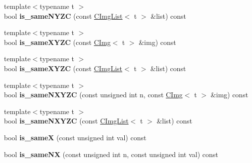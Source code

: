 \begin{DoxyCompactItemize}
\item 
\hypertarget{structcimg__library_1_1CImgList_a9d964b9defcf586d9e86625b7a97e3c5}{
{\footnotesize template$<$typename t $>$ }\\bool {\bfseries is\_\-sameNYZC} (const \hyperlink{structcimg__library_1_1CImgList}{CImgList}$<$ t $>$ \&list) const }
\label{structcimg__library_1_1CImgList_a9d964b9defcf586d9e86625b7a97e3c5}

\item 
\hypertarget{structcimg__library_1_1CImgList_a75a2889c78991b49f178a7a62013d9a1}{
{\footnotesize template$<$typename t $>$ }\\bool {\bfseries is\_\-sameXYZC} (const \hyperlink{structcimg__library_1_1CImg}{CImg}$<$ t $>$ \&img) const }
\label{structcimg__library_1_1CImgList_a75a2889c78991b49f178a7a62013d9a1}

\item 
\hypertarget{structcimg__library_1_1CImgList_a5a7ddc76848f1ea9ce123bc047d3e2fe}{
{\footnotesize template$<$typename t $>$ }\\bool {\bfseries is\_\-sameXYZC} (const \hyperlink{structcimg__library_1_1CImgList}{CImgList}$<$ t $>$ \&list) const }
\label{structcimg__library_1_1CImgList_a5a7ddc76848f1ea9ce123bc047d3e2fe}

\item 
\hypertarget{structcimg__library_1_1CImgList_a30c778297f0caf76c661b53bf29b364f}{
{\footnotesize template$<$typename t $>$ }\\bool {\bfseries is\_\-sameNXYZC} (const unsigned int n, const \hyperlink{structcimg__library_1_1CImg}{CImg}$<$ t $>$ \&img) const }
\label{structcimg__library_1_1CImgList_a30c778297f0caf76c661b53bf29b364f}

\item 
\hypertarget{structcimg__library_1_1CImgList_aa8bd5f88e9c8c1d7b946aa2466da743f}{
{\footnotesize template$<$typename t $>$ }\\bool {\bfseries is\_\-sameNXYZC} (const \hyperlink{structcimg__library_1_1CImgList}{CImgList}$<$ t $>$ \&list) const }
\label{structcimg__library_1_1CImgList_aa8bd5f88e9c8c1d7b946aa2466da743f}

\item 
\hypertarget{structcimg__library_1_1CImgList_a109ccf0092c2eb32ec57b451534c6e9a}{
bool {\bfseries is\_\-sameX} (const unsigned int val) const }
\label{structcimg__library_1_1CImgList_a109ccf0092c2eb32ec57b451534c6e9a}

\item 
\hypertarget{structcimg__library_1_1CImgList_af98ed77d724e0c308efe3e7efb878338}{
bool {\bfseries is\_\-sameNX} (const unsigned int n, const unsigned int val) const }
\label{structcimg__library_1_1CImgList_af98ed77d724e0c308efe3e7efb878338}


\end{DoxyCompactItemize}
